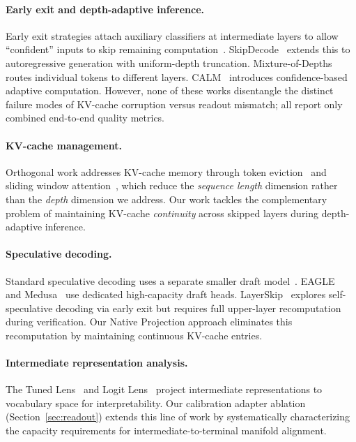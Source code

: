 \documentclass{article}
\begin{document}
\paragraph{Early exit and depth-adaptive inference.}
Early exit strategies attach auxiliary classifiers at intermediate layers to allow ``confident'' inputs to skip remaining computation~\cite{xin2020deebert,schwartz2020right,elbayad2020depth}. SkipDecode~\cite{del2023skipdecode} extends this to autoregressive generation with uniform-depth truncation. Mixture-of-Depths~\cite{raposo2024mixture} routes individual tokens to different layers. CALM~\cite{schuster2022confident} introduces confidence-based adaptive computation. However, none of these works disentangle the distinct failure modes of KV-cache corruption versus readout mismatch; all report only combined end-to-end quality metrics.

\paragraph{KV-cache management.}
Orthogonal work addresses KV-cache memory through token eviction~\cite{zhang2023h2o} and sliding window attention~\cite{xiao2024efficient}, which reduce the \emph{sequence length} dimension rather than the \emph{depth} dimension we address. Our work tackles the complementary problem of maintaining KV-cache \emph{continuity} across skipped layers during depth-adaptive inference.

\paragraph{Speculative decoding.}
Standard speculative decoding uses a separate smaller draft model~\cite{leviathan2023fast,chen2023accelerating}. EAGLE~\cite{li2024eagle} and Medusa~\cite{cai2024medusa} use dedicated high-capacity draft heads. LayerSkip~\cite{elhoushi2024layerskip} explores self-speculative decoding via early exit but requires full upper-layer recomputation during verification. Our Native Projection approach eliminates this recomputation by maintaining continuous KV-cache entries.

\paragraph{Intermediate representation analysis.}
The Tuned Lens~\cite{belrose2023eliciting} and Logit Lens~\cite{nostalgebraist2020logitlens} project intermediate representations to vocabulary space for interpretability. Our calibration adapter ablation (Section~\ref{sec:readout}) extends this line of work by systematically characterizing the capacity requirements for intermediate-to-terminal manifold alignment.
\end{document}
